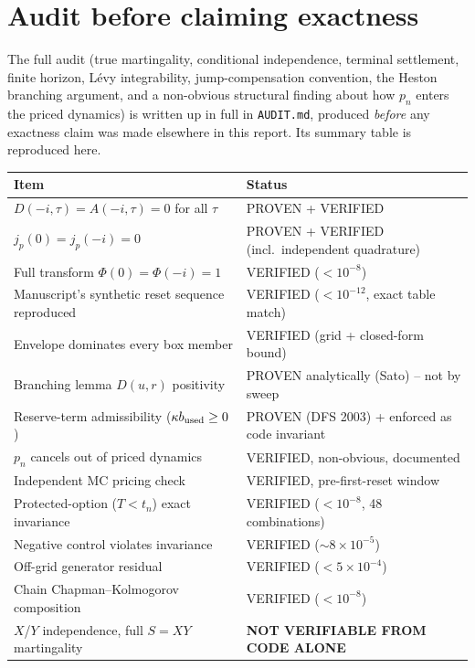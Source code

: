 \section{Audit before claiming exactness}
\label{sec:audit-summary}

The full audit (true martingality, conditional independence, terminal
settlement, finite horizon, L\'evy integrability, jump-compensation
convention, the Heston branching argument, and a non-obvious structural
finding about how $p_n$ enters the priced dynamics) is written up in full
in \texttt{AUDIT.md}, produced \emph{before} any exactness claim was made
elsewhere in this report. Its summary table is reproduced here.

\begin{center}
\small
\begin{tabular}{ll}
\toprule
Item & Status \\
\midrule
$D(-i,\tau)=A(-i,\tau)=0$ for all $\tau$ & PROVEN + VERIFIED \\
$j_p(0)=j_p(-i)=0$ & PROVEN + VERIFIED (incl.\ independent quadrature) \\
Full transform $\Phi(0)=\Phi(-i)=1$ & VERIFIED ($<10^{-8}$) \\
Manuscript's synthetic reset sequence reproduced & VERIFIED ($<10^{-12}$, exact table match) \\
Envelope dominates every box member & VERIFIED (grid + closed-form bound) \\
Branching lemma $D(u,r)$ positivity & PROVEN analytically (Sato) -- not by sweep \\
Reserve-term admissibility ($\kappa b_{\rm used}\ge0$) & PROVEN (DFS 2003) + enforced as code invariant \\
$p_n$ cancels out of priced dynamics & VERIFIED, non-obvious, documented \\
Independent MC pricing check & VERIFIED, pre-first-reset window \\
Protected-option ($T<t_n$) exact invariance & VERIFIED ($<10^{-8}$, 48 combinations) \\
Negative control violates invariance & VERIFIED ($\sim\!8\times10^{-5}$) \\
Off-grid generator residual & VERIFIED ($<5\times10^{-4}$) \\
Chain Chapman--Kolmogorov composition & VERIFIED ($<10^{-8}$) \\
$X$/$Y$ independence, full $S=XY$ martingality & \textbf{NOT VERIFIABLE FROM CODE ALONE} \\
\bottomrule
\end{tabular}
\end{center}
